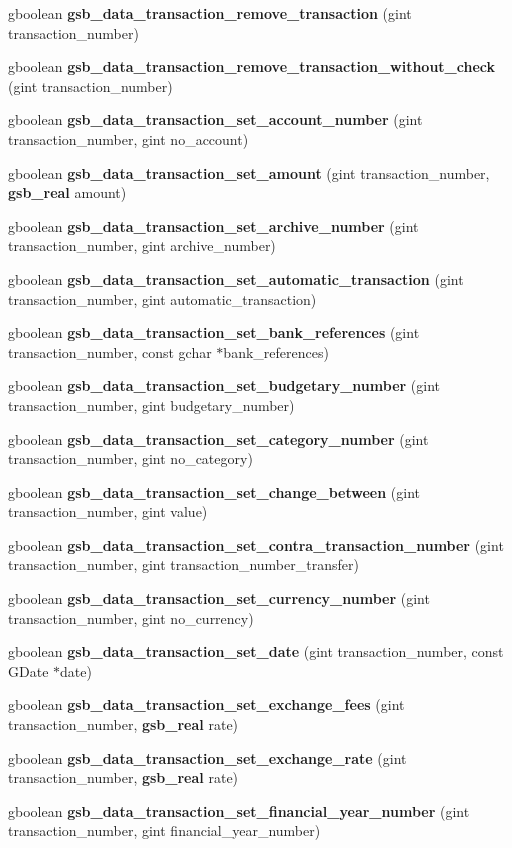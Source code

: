 \begin{DoxyCompactItemize}
\item 
gboolean {\bf gsb\_\-data\_\-transaction\_\-remove\_\-transaction} (gint transaction\_\-number)
\item 
gboolean {\bf gsb\_\-data\_\-transaction\_\-remove\_\-transaction\_\-without\_\-check} (gint transaction\_\-number)
\item 
gboolean {\bf gsb\_\-data\_\-transaction\_\-set\_\-account\_\-number} (gint transaction\_\-number, gint no\_\-account)
\item 
gboolean {\bf gsb\_\-data\_\-transaction\_\-set\_\-amount} (gint transaction\_\-number, {\bf gsb\_\-real} amount)
\item 
gboolean {\bf gsb\_\-data\_\-transaction\_\-set\_\-archive\_\-number} (gint transaction\_\-number, gint archive\_\-number)
\item 
gboolean {\bf gsb\_\-data\_\-transaction\_\-set\_\-automatic\_\-transaction} (gint transaction\_\-number, gint automatic\_\-transaction)
\item 
gboolean {\bf gsb\_\-data\_\-transaction\_\-set\_\-bank\_\-references} (gint transaction\_\-number, const gchar $\ast$bank\_\-references)
\item 
gboolean {\bf gsb\_\-data\_\-transaction\_\-set\_\-budgetary\_\-number} (gint transaction\_\-number, gint budgetary\_\-number)
\item 
gboolean {\bf gsb\_\-data\_\-transaction\_\-set\_\-category\_\-number} (gint transaction\_\-number, gint no\_\-category)
\item 
gboolean {\bf gsb\_\-data\_\-transaction\_\-set\_\-change\_\-between} (gint transaction\_\-number, gint value)
\item 
gboolean {\bf gsb\_\-data\_\-transaction\_\-set\_\-contra\_\-transaction\_\-number} (gint transaction\_\-number, gint transaction\_\-number\_\-transfer)
\item 
gboolean {\bf gsb\_\-data\_\-transaction\_\-set\_\-currency\_\-number} (gint transaction\_\-number, gint no\_\-currency)
\item 
gboolean {\bf gsb\_\-data\_\-transaction\_\-set\_\-date} (gint transaction\_\-number, const GDate $\ast$date)
\item 
gboolean {\bf gsb\_\-data\_\-transaction\_\-set\_\-exchange\_\-fees} (gint transaction\_\-number, {\bf gsb\_\-real} rate)
\item 
gboolean {\bf gsb\_\-data\_\-transaction\_\-set\_\-exchange\_\-rate} (gint transaction\_\-number, {\bf gsb\_\-real} rate)
\item 
gboolean {\bf gsb\_\-data\_\-transaction\_\-set\_\-financial\_\-year\_\-number} (gint transaction\_\-number, gint financial\_\-year\_\-number)

\end{DoxyCompactItemize}
